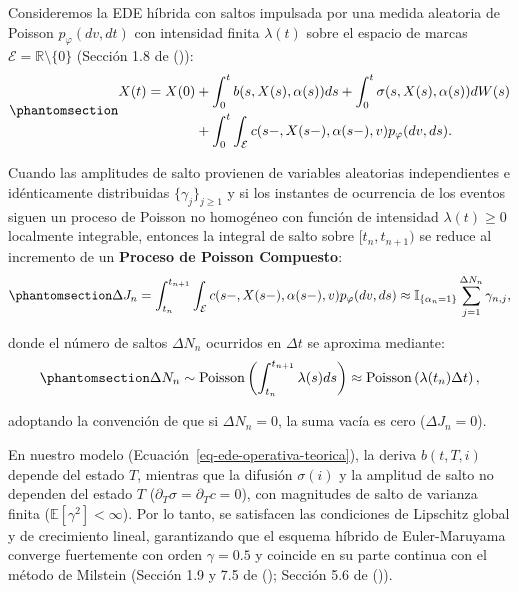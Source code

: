 \documentclass[
  spanish,
  us-letterpaper,
]{scrreprt}
\numberwithin{equation}{section}
\theoremstyle{plain}
\theoremstyle{plain}
\theoremstyle{definition}
\theoremstyle{plain}
\theoremstyle{remark}
\begin{document}
Consideremos la EDE híbrida con saltos impulsada por una medida
aleatoria de Poisson \(p_\varphi(dv, dt)\) con intensidad finita
\(\lambda(t)\) sobre el espacio de marcas
\(\mathcal{E} = \mathbb{R}\setminus\{0\}\) (Sección 1.8 de
()):
\begin{equation}\phantomsection\label{eq-ede-hibrida-saltos-num}{
\begin{aligned}
X(t) = X(0) &+ \int_0^t b(s, X(s), \alpha(s))ds + \int_0^t \sigma(s, X(s), \alpha(s))dW(s) \\
&+ \int_0^t \int_{\mathcal{E}} c(s-, X(s-), \alpha(s-), v) p_\varphi(dv, ds).
\end{aligned}
}\end{equation}

Cuando las amplitudes de salto provienen de variables aleatorias
independientes e idénticamente distribuidas \(\{\gamma_j\}_{j \ge 1}\) y
si los instantes de ocurrencia de los eventos siguen un proceso de
Poisson no homogéneo con función de intensidad \(\lambda(t) \geq 0\)
localmente integrable, entonces la integral de salto sobre
\([t_n, t_{n+1})\) se reduce al incremento de un \textbf{Proceso de
Poisson Compuesto}:
\begin{equation}\phantomsection\label{eq-incremento-poisson-compuesto}{
\Delta J_n = \int_{t_n}^{t_{n+1}} \int_{\mathcal{E}} c(s-, X(s-), \alpha(s-), v) p_\varphi(dv, ds) \approx \mathbb{I}_{\{\alpha_n = 1\}} \sum_{j=1}^{\Delta N_n} \gamma_{n, j},
}\end{equation}

donde el número de saltos \(\Delta N_n\) ocurridos en \(\Delta t\) se
aproxima mediante:
\begin{equation}\phantomsection\label{eq-conteo-poisson-paso}{
\Delta N_n \sim \text{Poisson}\left( \int_{t_n}^{t_{n+1}} \lambda(s)ds \right) \approx \text{Poisson}\left( \lambda(t_n)\Delta t \right),
}\end{equation}

adoptando la convención de que si \(\Delta N_n = 0\), la suma vacía es
cero (\(\Delta J_n = 0\)).

En nuestro modelo (Ecuación~\ref{eq-ede-operativa-teorica}), la deriva
\(b(t, T, i)\) depende del estado \(T\), mientras que la difusión
\(\sigma(i)\) y la amplitud de salto no dependen del estado \(T\)
(\(\partial_T \sigma = \partial_T c = 0\)), con magnitudes de salto de
varianza finita (\(\mathbb{E}[\gamma^2] < \infty\)). Por lo tanto, se
satisfacen las condiciones de Lipschitz global y de crecimiento lineal,
garantizando que el esquema híbrido de Euler-Maruyama converge
fuertemente con orden \(\gamma = 0.5\) y coincide en su parte continua
con el método de Milstein (Sección 1.9 y 7.5 de
();
Sección 5.6 de ()).
\end{document}
